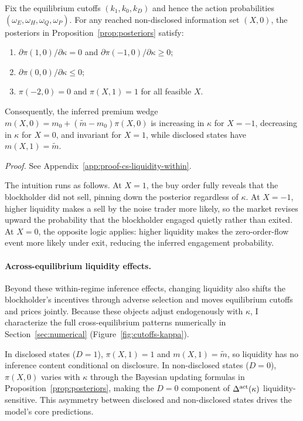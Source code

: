 \begin{proposition}
\label{prop:cs-liquidity-within}
Fix the equilibrium cutoffs $(k_1,k_0,k_D)$ and hence the action probabilities $(\omega_E,\omega_H,\omega_Q,\omega_P)$. For any reached non-disclosed information set $(X,0)$, the posteriors in Proposition~\ref{prop:posteriors} satisfy:
\begin{enumerate}[label=\textup{(\alph*)},leftmargin=2em]
\item $\partial \pi(1,0)/\partial \kappa = 0$ and $\partial \pi(-1,0)/\partial \kappa \ge 0$;
\item $\partial \pi(0,0)/\partial \kappa \le 0$;
\item $\pi(-2,0)=0$ and $\pi(X,1)=1$ for all feasible $X$.
\end{enumerate}
Consequently, the inferred premium wedge $m(X,0)=m_0+(\tilde{m}-m_0)\pi(X,0)$ is increasing in $\kappa$ for $X=-1$, decreasing in $\kappa$ for $X=0$, and invariant for $X=1$, while disclosed states have $m(X,1)=\tilde{m}$.
\end{proposition}
\textit{Proof.} See Appendix~\ref{app:proof-cs-liquidity-within}.

The intuition runs as follows. At $X=1$, the buy order fully reveals that the blockholder did not sell, pinning down the posterior regardless of $\kappa$. At $X=-1$, higher liquidity makes a sell by the noise trader more likely, so the market revises upward the probability that the blockholder engaged quietly rather than exited. At $X=0$, the opposite logic applies: higher liquidity makes the zero-order-flow event more likely under exit, reducing the inferred engagement probability.

\paragraph{Across-equilibrium liquidity effects.}
Beyond these within-regime inference effects, changing liquidity also shifts the blockholder's incentives through adverse selection and moves equilibrium cutoffs and prices jointly. Because these objects adjust endogenously with $\kappa$, I characterize the full cross-equilibrium patterns numerically in Section~\ref{sec:numerical} (Figure~\ref{fig:cutoffs-kappa}).

In disclosed states ($D=1$), $\pi(X,1)=1$ and $m(X,1)=\tilde{m}$, so liquidity has no inference content conditional on disclosure. In non-disclosed states ($D=0$), $\pi(X,0)$ varies with $\kappa$ through the Bayesian updating formulas in Proposition~\ref{prop:posteriors}, making the $D=0$ component of $\Delta^{\textup{act}}(\kappa)$ liquidity-sensitive. This asymmetry between disclosed and non-disclosed states drives the model's core predictions.

